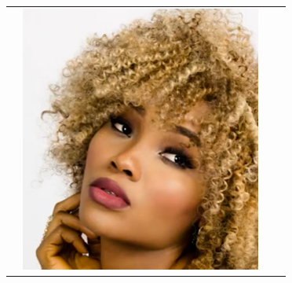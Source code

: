 \begin{table}[H]
\begin{tabular}{|N||c|c|c|}
\begin{minipage}{.29\textwidth}
  \end{minipage} \\
    \hline  \label{row:photoshop_match_other_2} &
  \begin{minipage}{.29\textwidth}
    \includegraphics[width=\textwidth,height=\textheight,keepaspectratio]{images/match_other_2_orig}
  \end{minipage} & 
  \begin{minipage}{.29\textwidth}

\end{minipage}
\end{tabular}
\end{table}
